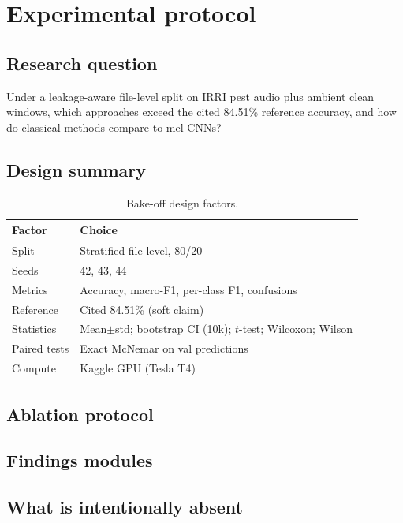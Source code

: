 \section{Experimental protocol}
\label{sec:protocol}

\subsection{Research question}
Under a leakage-aware file-level split on IRRI pest audio plus ambient clean windows, which approaches exceed the cited 84.51\% reference accuracy, and how do classical methods compare to mel-CNNs?

\subsection{Design summary}
\begin{table}[H]
\centering
\caption{Bake-off design factors.}
\label{tab:design}
\begin{tabular}{@{}ll@{}}
\toprule
Factor & Choice \\
\midrule
Split & Stratified file-level, 80/20 \\
Seeds & 42, 43, 44 \\
Metrics & Accuracy, macro-F1, per-class F1, confusions \\
Reference & Cited 84.51\% (soft claim) \\
Statistics & Mean$\pm$std; bootstrap CI (10k); $t$-test; Wilcoxon; Wilson \\
Paired tests & Exact McNemar on val predictions \\
Compute & Kaggle GPU (Tesla T4) \\
\bottomrule
\end{tabular}
\end{table}

\subsection{Ablation protocol}

\subsection{Findings modules}

\subsection{What is intentionally absent}
